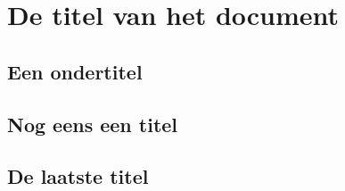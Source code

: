 \documentclass[a4paper, 11pt]{article}
\begin{document}
\setlength{\parskip}{0pt}

\begin{abstract}
\lipsum[4]
\end{abstract}

\section{De titel van het document}
\lipsum[4]

\subsection{Een ondertitel}
\lipsum[4]

\subsection{Nog eens een titel}
\lipsum[4]

\subsection{De laatste titel}
\lipsum[4]
\end{document}
